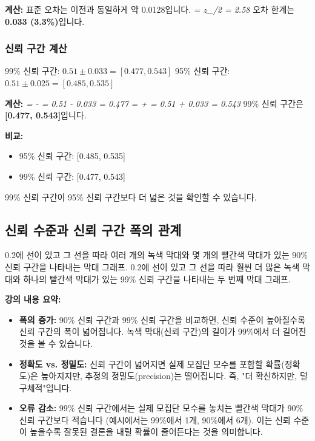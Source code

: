 \documentclass[11pt,a4paper]{book}
\newcommand{\formula}[1]{\textit{#1}}
\theoremstyle{definition}
\begin{document}
\textbf{계산:}
표준 오차는 이전과 동일하게 약 0.0128입니다.
\formula{ = z_{\alpha/2} \times {} = 2.58 \times 0.0128 \approx 0.033}
오차 한계는 \textbf{0.033 (3.3\%)}입니다.

\subsubsection{신뢰 구간 계산}

\begin{tcolorbox}[title={슬라이드 78: 연습 - 풀이}]
99\% 신뢰 구간: $0.51 \pm 0.033 = [0.477, 0.543]$
95\% 신뢰 구간: $0.51 \pm 0.025 = [0.485, 0.535]$
\end{tcolorbox}

\textbf{계산:}
\formula{ =  -  = 0.51 - 0.033 = 0.477}
\formula{ =  + \text{오차 한계} = 0.51 + 0.033 = 0.543}
99\% 신뢰 구간은 \textbf{[0.477, 0.543]}입니다.

\textbf{비교:}
\begin{itemize}
    \item 95\% 신뢰 구간: [0.485, 0.535]
    \item 99\% 신뢰 구간: [0.477, 0.543]
\end{itemize}
99\% 신뢰 구간이 95\% 신뢰 구간보다 더 넓은 것을 확인할 수 있습니다.

\subsection{신뢰 수준과 신뢰 구간 폭의 관계}

\begin{tcolorbox}[title={슬라이드 79: 90\% 신뢰 구간 vs. 99\% 신뢰 구간}]
0.2에 선이 있고 그 선을 따라 여러 개의 녹색 막대와 몇 개의 빨간색 막대가 있는 90\% 신뢰 구간을 나타내는 막대 그래프. 0.2에 선이 있고 그 선을 따라 훨씬 더 많은 녹색 막대와 하나의 빨간색 막대가 있는 99\% 신뢰 구간을 나타내는 두 번째 막대 그래프.
\end{tcolorbox}

\textbf{강의 내용 요약:}
\begin{itemize}
    \item \textbf{폭의 증가:} 90\% 신뢰 구간과 99\% 신뢰 구간을 비교하면, 신뢰 수준이 높아질수록 신뢰 구간의 폭이 넓어집니다. 녹색 막대(신뢰 구간)의 길이가 99\%에서 더 길어진 것을 볼 수 있습니다.
    \item \textbf{정확도 vs. 정밀도:} 신뢰 구간이 넓어지면 실제 모집단 모수를 포함할 확률(정확도)은 높아지지만, 추정의 정밀도(precision)는 떨어집니다. 즉, "더 확신하지만, 덜 구체적"입니다.
    \item \textbf{오류 감소:} 99\% 신뢰 구간에서는 실제 모집단 모수를 놓치는 빨간색 막대가 90\% 신뢰 구간보다 적습니다 (예시에서는 99\%에서 1개, 90\%에서 6개). 이는 신뢰 수준이 높을수록 잘못된 결론을 내릴 확률이 줄어든다는 것을 의미합니다.
\end{itemize}
\end{document}
